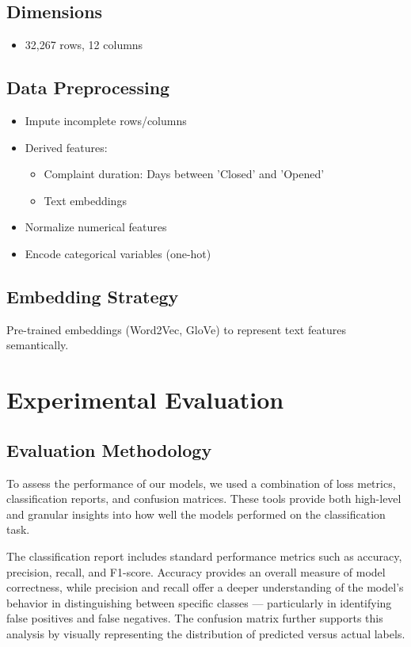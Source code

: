 \documentclass[final]{article}
\begin{document}
\subsection{Dimensions}
\begin{itemize}
  \item 32,267 rows, 12 columns
\end{itemize}

\subsection{Data Preprocessing}
\begin{itemize}
  \item Impute incomplete rows/columns
  \item Derived features:
  \begin{itemize}
    \item Complaint duration: Days between 'Closed' and 'Opened'
    \item Text embeddings
  \end{itemize}
  \item Normalize numerical features
  \item Encode categorical variables (one-hot)
\end{itemize}

\subsection{Embedding Strategy}
Pre-trained embeddings (Word2Vec, GloVe) to represent text features semantically.

\section{Experimental Evaluation}

\subsection{Evaluation Methodology}

To assess the performance of our models, we used a combination of loss metrics, classification reports, and confusion matrices. These tools provide both high-level and granular insights into how well the models performed on the classification task.

The classification report includes standard performance metrics such as accuracy, precision, recall, and F1-score. Accuracy provides an overall measure of model correctness, while precision and recall offer a deeper understanding of the model’s behavior in distinguishing between specific classes — particularly in identifying false positives and false negatives. The confusion matrix further supports this analysis by visually representing the distribution of predicted versus actual labels.
\end{document}
